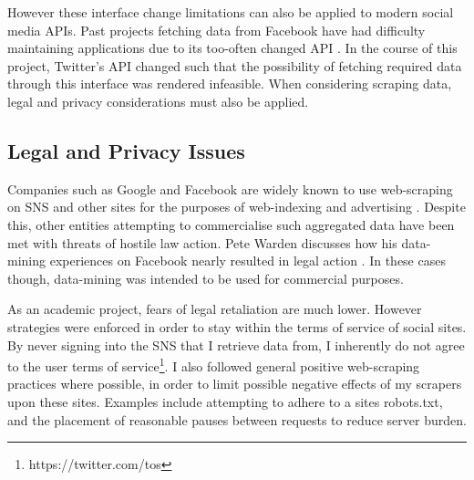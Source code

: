 However these interface change limitations can also be applied to modern social media APIs. Past projects fetching data from Facebook have had difficulty maintaining applications due to its too-often changed API \cite{kosinski2013private}. In the course of this project, Twitter's API changed such that the possibility of fetching required data through this interface was rendered infeasible. When considering scraping data, legal and privacy considerations must also be applied.





\subsection{Legal and Privacy Issues}

Companies such as Google and Facebook are widely known to use web-scraping on SNS and other sites for the purposes of web-indexing and advertising \cite{no_api_for_me}. Despite this, other entities attempting to commercialise such aggregated data have been met with threats of hostile law action. Pete Warden discusses how his data-mining experiences on Facebook nearly resulted in legal action \cite{facebook_sued}. In these cases though, data-mining was intended to be used for commercial purposes. 

As an academic project, fears of legal retaliation are much lower. However strategies were enforced in order to stay within the terms of service of social sites. By never signing into the SNS that I retrieve data from, I inherently do not agree to the user terms of service\footnote{https://twitter.com/tos}. I also followed general positive web-scraping practices where possible, in order to limit possible negative effects of my scrapers upon these sites. Examples include attempting to adhere to a sites robots.txt, and the placement of reasonable pauses between requests to reduce server burden. 

